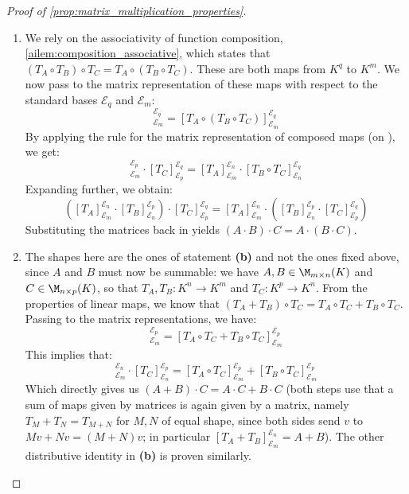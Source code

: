 \begin{proof}[Proof of \cref{prop:matrix_multiplication_properties}]
\begin{enumerate}[label=\textbf{(\alph*)}]
    \item We rely on the associativity of function composition, \cref{ailem:composition_associative}, which states that $(T_A \circ T_B) \circ T_C = T_A \circ (T_B \circ T_C)$. These are both maps from $K^q$ to $K^m$. We now pass to the matrix representation of these maps with respect to the standard bases $\mathcal{E}_q$ and $\mathcal{E}_m$:
    \begin{equation*}
        [(T_A \circ T_B) \circ T_C]_{\mathcal{E}_m}^{\mathcal{E}_q} = [T_A \circ (T_B \circ T_C)]_{\mathcal{E}_m}^{\mathcal{E}_q}
    \end{equation*}
    By applying the rule for the matrix representation of composed maps (on ), we get:
    \begin{equation*}
        [T_A \circ T_B]_{\mathcal{E}_m}^{\mathcal{E}_p} \cdot [T_C]_{\mathcal{E}_p}^{\mathcal{E}_q} = [T_A]_{\mathcal{E}_m}^{\mathcal{E}_n} \cdot [T_B \circ T_C]_{\mathcal{E}_n}^{\mathcal{E}_q}
    \end{equation*}
    Expanding further, we obtain:
    \begin{equation*}
        \left([T_A]_{\mathcal{E}_m}^{\mathcal{E}_n} \cdot [T_B]_{\mathcal{E}_n}^{\mathcal{E}_p}\right) \cdot [T_C]_{\mathcal{E}_p}^{\mathcal{E}_q} = [T_A]_{\mathcal{E}_m}^{\mathcal{E}_n} \cdot \left([T_B]_{\mathcal{E}_n}^{\mathcal{E}_p} \cdot [T_C]_{\mathcal{E}_p}^{\mathcal{E}_q}\right)
    \end{equation*}
    Substituting the matrices back in yields $(A \cdot B) \cdot C = A \cdot (B \cdot C)$.
    
    \item
    The shapes here are the ones of statement \textbf{(b)} and not the ones fixed above, since $A$ and $B$ must now be summable: we have $A, B \in \M_{m \times n}(K)$ and $C \in \M_{n \times p}(K)$, so that $T_A, T_B: K^n \to K^m$ and $T_C: K^p \to K^n$.
    From the properties of linear maps, we know that $(T_A + T_B) \circ T_C = T_A \circ T_C + T_B \circ T_C$. Passing to the matrix representations, we have:
    \begin{equation*}
        [(T_A + T_B) \circ T_C]_{\mathcal{E}_m}^{\mathcal{E}_p} = [T_A \circ T_C + T_B \circ T_C]_{\mathcal{E}_m}^{\mathcal{E}_p}
    \end{equation*}
    This implies that:
    \begin{equation*}
        [T_A + T_B]_{\mathcal{E}_m}^{\mathcal{E}_n} \cdot [T_C]_{\mathcal{E}_n}^{\mathcal{E}_p} = [T_A \circ T_C]_{\mathcal{E}_m}^{\mathcal{E}_p} + [T_B \circ T_C]_{\mathcal{E}_m}^{\mathcal{E}_p}
    \end{equation*}
    Which directly gives us $(A + B) \cdot C = A \cdot C + B \cdot C$ (both steps use that a sum of maps given by matrices is again given by a matrix, namely $T_M + T_N = T_{M+N}$ for $M, N$ of equal shape, since both sides send $v$ to $Mv + Nv = (M+N)v$; in particular $[T_A + T_B]_{\mathcal{E}_m}^{\mathcal{E}_n} = A + B$). The other distributive identity in \textbf{(b)} is proven similarly.
    

\end{enumerate}
\end{proof}
